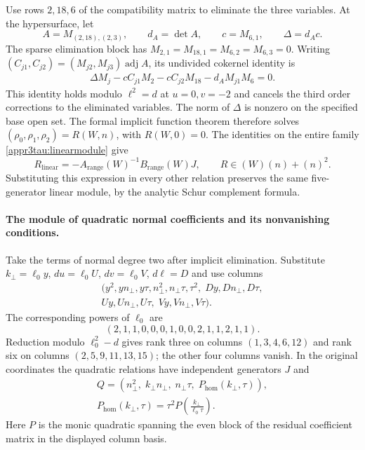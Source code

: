 \documentclass[11pt,a4paper]{article}
\numberwithin{equation}{section}
\theoremstyle{plain}
\theoremstyle{definition}
\theoremstyle{remark}
\begin{document}
Use rows $2,18,6$ of the compatibility matrix to eliminate the three variables. At the
hypersurface, let
\[
 A=M_{(2,18),(2,3)},\qquad d_A=\det A,\qquad
 c=M_{6,1},\qquad \Delta=d_Ac.
\]
The sparse elimination block has
$M_{2,1}=M_{18,1}=M_{6,2}=M_{6,3}=0$.
Writing $(C_{j1},C_{j2})=(M_{j2},M_{j3})\operatorname{adj}A$, its
undivided cokernel identity is
\begin{equation}\label{appr3tau:rangeidentity}
 \begin{aligned}
 \Delta M_j-cC_{j1}M_2-cC_{j2}M_{18}
              -d_AM_{j1}M_6=0 .
 \end{aligned}
\end{equation}
This identity holds modulo $\ell^2=d$ at $u=0,v=-2$ and cancels
the third order corrections to the eliminated variables.  The norm of $\Delta$ is nonzero on the specified base
open set.  The formal implicit function theorem therefore solves
$(\rho_0,\rho_1,\rho_2)=R(W,n)$, with $R(W,0)=0$.  The identities on the entire family
\eqref{appr3tau:linearmodule} give
\[
 R_{\mathrm{linear}}=-A_{\mathrm{range}}(W)^{-1}B_{\mathrm{range}}(W)J,
 \qquad R\in(W)(n)+(n)^2.
\]
Substituting this expression in every other relation preserves the same
five-generator linear module, by the analytic Schur complement formula.

\paragraph{The module of quadratic normal coefficients and its nonvanishing conditions.}
Take the terms of normal degree two after implicit elimination.
Substitute
$k_\perp=\ell_0 y$, $du=\ell_0 U$, $dv=\ell_0 V$, $d\ell=D$ and use columns
\[
 \begin{gathered}
 (y^2,yn_\perp,y\tau,n_\perp^2,n_\perp\tau,\tau^2,\;
   Dy,Dn_\perp,D\tau,\\
   Uy,Un_\perp,U\tau,\;Vy,Vn_\perp,V\tau).
 \end{gathered}
\]
The corresponding powers of $\ell_0$ are
\[
 (2,1,1,0,0,0,1,0,0,2,1,1,2,1,1).
\]
Reduction modulo $\ell_0^2-d$ gives rank three on columns
$(1,3,4,6,12)$ and rank six on columns $(2,5,9,11,13,15)$;
the other four columns vanish. In the original coordinates the
quadratic relations have independent generators $J$ and
\begin{equation}\label{appr3tau:Q}
 \begin{gathered}
 Q=(n_\perp^2,\;k_\perp n_\perp,\;n_\perp\tau,\;P_{\mathrm{hom}}(k_\perp,\tau)),\\
 P_{\mathrm{hom}}(k_\perp,\tau)=\tau^2P\left(\frac{k_\perp}{\ell_0\tau}\right).
 \end{gathered}
\end{equation}
Here $P$ is the monic quadratic spanning the even block of the
residual coefficient matrix in the displayed column basis.
\end{document}
